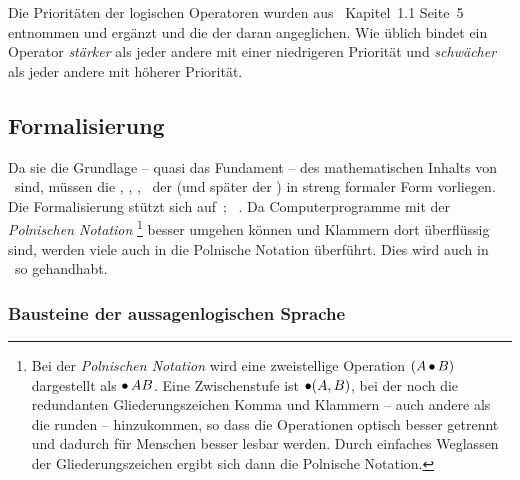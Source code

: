 Die Prioritäten der logischen Operatoren wurden aus~\cite{bib:Rautenberg} Kapitel~1.1 Seite~5 entnommen und ergänzt und die der  daran angeglichen.
Wie üblich bindet ein Operator \emph{stärker} als jeder andere mit einer niedrigeren Priorität und \emph{schwächer} als jeder andere mit höherer Priorität.

\subsection{Formalisierung}%
\label{sub:Formalisierung}

Da sie die Grundlage -- quasi das Fundament -- des mathematischen Inhalts von \ASBA\ sind, müssen die , , , \textusw\ der  (und später der ) in streng formaler Form vorliegen.
Die Formalisierung stützt sich auf~\cite{bib:Aussagenlogik}; \alsoname~\cite{bib:LogikDe, bib:LogikEn}.
Da Computerprogramme mit der \emph{Polnischen Notation}%
\footnote{%
	Bei der \emph{Polnischen Notation} wird eine zweistellige Operation $(A\operatorname{\bullet} B)$ dargestellt als $\operatorname{\bullet} A B$.
	Eine Zwischenstufe ist $\operatorname{\bullet}(A,B)$, bei der noch die redundanten Gliederungszeichen Komma und Klammern -- auch andere als die runden -- hinzukommen, so dass die Operationen optisch besser getrennt und dadurch für Menschen besser lesbar werden.
	Durch einfaches Weglassen der Gliederungszeichen ergibt sich dann die Polnische Notation.%
}
besser umgehen können und Klammern dort überflüssig sind, werden viele  auch in die Polnische Notation überführt. Dies wird auch in \ASBA\ so gehandhabt.

\subsubsection{Bausteine der aussagenlogischen Sprache}%
\label{subsub:Bausteine}

